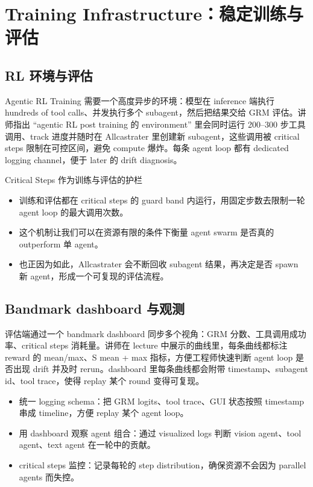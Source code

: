 \section{Training Infrastructure：稳定训练与评估}

\subsection{RL 环境与评估}
Agentic RL Training 需要一个高度异步的环境：模型在 inference 端执行 hundreds of tool calls、并发执行多个 subagent，然后把结果交给 GRM 评估。讲师指出 ``agentic RL post training 的 environment'' 里会同时运行 200--300 步工具调用、track 进度并随时在 Allcastrater 里创建新 subagent，这些调用被 critical steps 限制在可控区间，避免 compute 爆炸。每条 agent loop 都有 dedicated logging channel，便于 later 的 drift diagnosis。

\begin{knowledgebox}{Critical Steps 作为训练与评估的护栏}
\begin{itemize}
    \item 训练和评估都在 critical steps 的 guard band 内运行，用固定步数去限制一轮 agent loop 的最大调用次数。
    \item 这个机制让我们可以在资源有限的条件下衡量 agent swarm 是否真的 outperform 单 agent。
    \item 也正因为如此，Allcastrater 会不断回收 subagent 结果，再决定是否 spawn 新 agent，形成一个可复现的评估流程。
\end{itemize}
\end{knowledgebox}

\subsection{Bandmark dashboard 与观测}
评估端通过一个 bandmark dashboard 同步多个视角：GRM 分数、工具调用成功率、critical steps 消耗量。讲师在 lecture 中展示的曲线里，每条曲线都标注 reward 的 mean/max、S mean + max 指标，方便工程师快速判断 agent loop 是否出现 drift 并及时 rerun。dashboard 里每条曲线都会附带 timestamp、subagent id、tool trace，使得 replay 某个 round 变得可复现。
\begin{itemize}
    \item 统一 logging schema：把 GRM logits、tool trace、GUI 状态按照 timestamp 串成 timeline，方便 replay 某个 agent loop。
    \item 用 dashboard 观察 agent 组合：通过 visualized logs 判断 vision agent、tool agent、text agent 在一轮中的贡献。
    \item critical steps 监控：记录每轮的 step distribution，确保资源不会因为 parallel agents 而失控。
\end{itemize}

